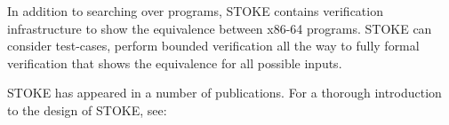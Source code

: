 In addition to searching over programs, STOKE contains verification infrastructure to show the equivalence between x86-64 programs. STOKE can consider test-cases, perform bounded verification all the way to fully formal verification that shows the equivalence for all possible inputs.

STOKE has appeared in a number of publications. For a thorough introduction to the design of STOKE, see:
